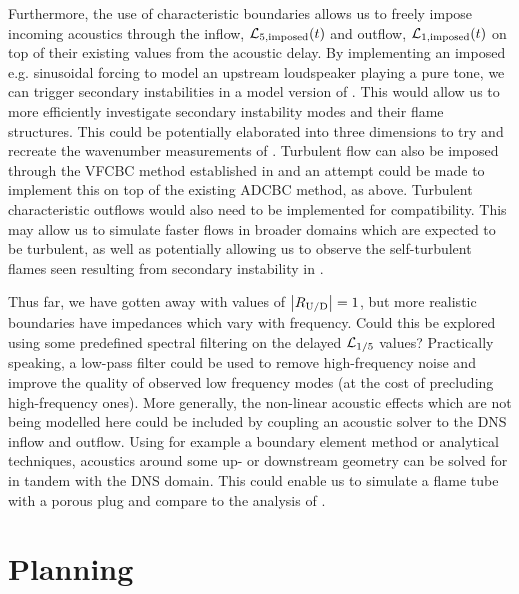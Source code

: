 Furthermore, the use of characteristic boundaries allows us to freely impose incoming acoustics through the inflow, $\mathcal{L}_{5, \mathrm{imposed}}(t)$ and outflow, $\mathcal{L}_{1, \mathrm{imposed}}(t)$ on top of their existing values from the acoustic delay. By implementing an imposed e.g. sinusoidal forcing to model an upstream loudspeaker playing a pure tone, we can trigger secondary instabilities in a model version of \cite{searby1991ParametricAcousticInstability}. This would allow us to more efficiently investigate secondary instability modes and their flame structures. This could be potentially elaborated into three dimensions to try and recreate the wavenumber measurements of \cite{delfin2024DeterminationMethodMarkstein}. Turbulent flow can also be imposed through the VFCBC method established in \cite{guezennec2009AcousticallyNonreflectingReflecting} and an attempt could be made to implement this on top of the existing ADCBC method, as above. Turbulent characteristic outflows would also need to be implemented for compatibility. This may allow us to simulate faster flows in broader domains which are expected to be turbulent, as well as potentially allowing us to observe the self-turbulent flames seen resulting from secondary instability in \cite{searby1992AcousticInstabilityPremixed}.

Thus far, we have gotten away with values of $\abs{R_{\mathrm{U}/\mathrm{D}}} = 1$, but more realistic boundaries have impedances which vary with frequency. Could this be explored using some predefined spectral filtering on the delayed $\mathcal{L}_{1/5}$ values? Practically speaking, a low-pass filter could be used to remove high-frequency noise and improve the quality of observed low frequency modes (at the cost of precluding high-frequency ones). More generally, the non-linear acoustic effects which are not being modelled here could be included by coupling an acoustic solver to the DNS inflow and outflow. Using for example a boundary element method or analytical techniques, acoustics around some up- or downstream geometry can be solved for in tandem with the DNS domain. This could enable us to simulate a flame tube with a porous plug and compare to the analysis of \cite{gaton-perez2025MitigationThermoacousticInstabilities}.



\section{Planning}

